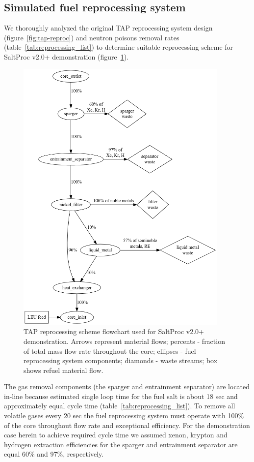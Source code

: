 \documentclass[12pt]{article} %
\begin{document}
\subsection{Simulated fuel reprocessing system}
We thoroughly analyzed the original \gls{TAP} reprocessing system design 
(figure~\ref{fig:tap-reproc}) and neutron poisons removal rates 
(table~\ref{tab:reprocessing_list}) to determine suitable reprocessing 
scheme for SaltProc v2.0+ demonstration (figure~\ref{fig:demo-repro-scheme}).
\begin{figure}[htp!] %
  \centering
		  \includegraphics[width=0.93\textwidth]{demo_reprocessing_scheme.png}
  \caption{\gls{TAP} reprocessing scheme flowchart used for SaltProc v2.0+ 
  demonstration. Arrows represent material flows; percents - fraction of total 
  mass flow rate throughout the core; ellipses - fuel reprocessing system 
  components; diamonds - waste streams; box shows refuel material flow.}
  \label{fig:demo-repro-scheme}
\end{figure}

The gas removal components (the sparger and entrainment separator) are located 
in-line because estimated single loop time for the fuel salt is about 
18 sec and approximately equal cycle time (table~\ref{tab:reprocessing_list}). 
To remove all volatile gases every 20 sec the fuel reprocessing system must 
operate with 100\% of the core throughout flow rate and exceptional efficiency. 
For the demonstration case herein to achieve required cycle time we assumed 
xenon, krypton and hydrogen extraction efficiencies for the sparger and 
entrainment separator are equal 60\% and 97\%, respectively.
\end{document}
